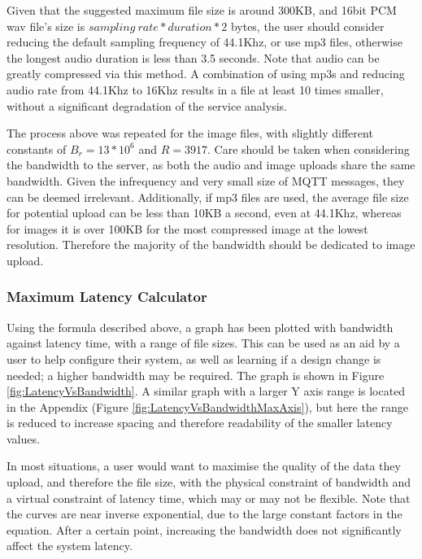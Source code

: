 \documentclass{article}
\begin{document}
Given that the suggested maximum file size is around 300KB, and 16bit PCM wav file's size is $sampling\ rate*duration*2$ bytes, the user should consider reducing the default sampling frequency of 44.1Khz, or use mp3 files, otherwise the longest audio duration is less than 3.5 seconds. Note that audio can be greatly compressed via this method. A combination of using mp3s and reducing audio rate from 44.1Khz to 16Khz results in a file at least 10 times smaller, without a significant degradation of the service analysis.

The process above was repeated for the image files, with slightly different constants of $B_r = 13*10^6$ and $R = 3917$. Care should be taken when considering the bandwidth to the server, as both the audio and image uploads share the same bandwidth. Given the infrequency and very small size of MQTT messages, they can be deemed irrelevant. Additionally, if mp3 files are used, the average file size for potential upload can be less than 10KB a second, even at 44.1Khz, whereas for images it is over 100KB for the most compressed image at the lowest resolution. Therefore the majority of the bandwidth should be dedicated to image upload.

\subsubsection{Maximum Latency Calculator}
Using the formula described above, a graph has been plotted with bandwidth against latency time, with a range of file sizes. This can be used as an aid by a user to help configure their system, as well as learning if a design change is needed; a higher bandwidth may be required. The graph is shown in Figure \ref{fig:LatencyVsBandwidth}. A similar graph with a larger Y axis range is located in the Appendix (Figure \ref{fig:LatencyVsBandwidthMaxAxis}), but here the range is reduced to increase spacing and therefore readability of the smaller latency values. 

In most situations, a user would want to maximise the quality of the data they upload, and therefore the file size, with the physical constraint of bandwidth and a virtual constraint of latency time, which may or may not be flexible. Note that the curves are near inverse exponential, due to the large constant factors in the equation. After a certain point, increasing the bandwidth does not significantly affect the system latency.
\end{document}
